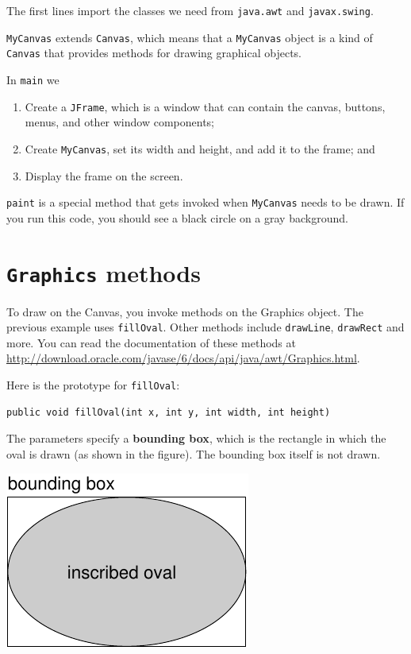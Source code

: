 \documentclass[12pt]{book}
\theoremstyle{exercise}
\begin{document}
The first lines import the classes we need from {\tt java.awt}
and {\tt javax.swing}.

{\tt MyCanvas} extends {\tt Canvas}, which means that a
{\tt MyCanvas} object is a kind of {\tt Canvas} that provides
methods for drawing graphical objects.

In {\tt main} we

\begin{enumerate}

\item Create a {\tt JFrame}, which is a window that can contain the
  canvas, buttons, menus, and other window components;

\item Create {\tt MyCanvas}, set its width and height, and add it
  to the frame; and

\item Display the frame on the screen.

\end{enumerate}

{\tt paint} is a special method that gets invoked
when {\tt MyCanvas} needs to be drawn.
If you run this code, you should see a black circle on a gray
background.


\section{{\tt Graphics} methods}

To draw on the Canvas, you invoke methods on the
Graphics object.  The previous example uses {\tt fillOval}.
Other methods include {\tt drawLine}, {\tt drawRect} and more.
You can read the documentation of these methods at
\url{http://download.oracle.com/javase/6/docs/api/java/awt/Graphics.html}.

Here is the prototype for {\tt fillOval}:

\begin{lstlisting}
public void fillOval(int x, int y, int width, int height)
\end{lstlisting}

The parameters specify
a {\bf bounding box}, which is the rectangle
in which the oval is drawn (as shown in the figure).  The
bounding box itself is not drawn.



\includegraphics{figs/circle.pdf}
\end{document}
